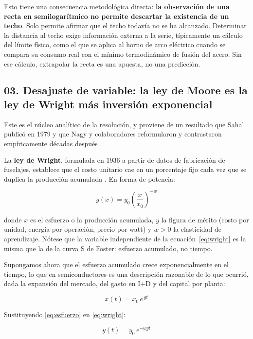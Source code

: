 \documentclass[11pt,letterpaper]{article}
\begin{document}
Esto tiene una consecuencia metodológica directa: \textbf{la observación de una
recta en semilogarítmico no permite descartar la existencia de un techo}. Solo
permite afirmar que el techo todavía no se ha alcanzado. Determinar la distancia
al techo exige información externa a la serie, típicamente un cálculo del límite
físico, como el que se aplica al horno de arco eléctrico cuando se compara su
consumo real con el mínimo termodinámico de fusión del acero. Sin ese cálculo,
extrapolar la recta es una apuesta, no una predicción.

\subsection*{03. Desajuste de variable: la ley de Moore es la ley de Wright más
inversión exponencial}

Este es el núcleo analítico de la resolución, y proviene de un resultado que
Sahal publicó en 1979 \parencite{sahal1979} y que Nagy y colaboradores
reformularon y contrastaron empíricamente décadas después
\parencite{nagy2013,farmer2016}.

La \textbf{ley de Wright}, formulada en 1936 a partir de datos de fabricación de
fuselajes, establece que el costo unitario cae en un porcentaje fijo cada vez que
se duplica la producción acumulada \parencite{wright1936}. En forma de potencia:

\begin{equation}
  y(x) = y_0 \left(\frac{x}{x_0}\right)^{-w}
  \label{eq:wright}
\end{equation}

donde $x$ es el esfuerzo o la producción acumulada, $y$ la figura de mérito
(costo por unidad, energía por operación, precio por watt) y $w > 0$ la
elasticidad de aprendizaje. Nótese que la variable independiente de la
ecuación~\eqref{eq:wright} es la misma que la de la curva S de Foster: esfuerzo
acumulado, no tiempo.

Supongamos ahora que el esfuerzo acumulado crece exponencialmente en el tiempo,
lo que en semiconductores es una descripción razonable de lo que ocurrió, dada
la expansión del mercado, del gasto en I+D y del capital por planta:

\begin{equation}
  x(t) = x_0\, e^{\,g t}
  \label{eq:esfuerzo}
\end{equation}

Sustituyendo \eqref{eq:esfuerzo} en \eqref{eq:wright}:

\begin{equation}
  \boxed{\;y(t) = y_0\, e^{-w g t}\;}
  \label{eq:moore}
\end{equation}
\end{document}
